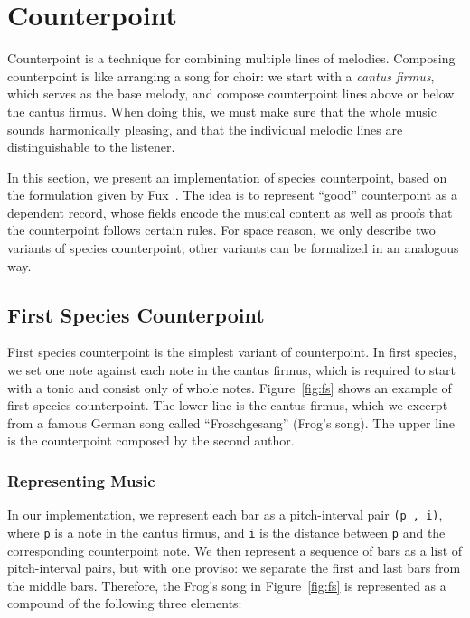 \section{Counterpoint}
\label{sec:cp}

Counterpoint is a technique for combining multiple lines of melodies.
Composing counterpoint is like arranging a song for choir:
we start with a \emph{cantus firmus}, which serves as the base melody,
and compose counterpoint lines above or below the cantus firmus.
When doing this, we must make sure that the whole music sounds
harmonically pleasing, and that the individual melodic lines are
distinguishable to the listener.

In this section, we present an implementation of species counterpoint,
based on the formulation given by Fux~\citep{fux-cp}.
The idea is to represent ``good'' counterpoint  as a dependent record,
whose fields encode the musical content as well as proofs that the
counterpoint follows certain rules.
For space reason, we only describe two variants of species counterpoint;
other variants can be formalized in an analogous way.

\subsection{First Species Counterpoint}
\label{sec:cp:fs}

\FS

First species counterpoint is the simplest variant of counterpoint.
In first species, we set one note against each note in the cantus firmus,
which is required to start with a tonic and consist only of whole notes.
Figure~\ref{fig:fs} shows an example of first species counterpoint.
The lower line is the cantus firmus, which we excerpt from a famous
German song called ``Froschgesang'' (Frog's song).
The upper line is the counterpoint composed by the second author.

\subsubsection{Representing Music}

In our implementation, we represent each bar as a pitch-interval
pair \texttt{(p ,  i)}, where \texttt{p} is a note in the cantus firmus,
and \texttt{i} is the distance between \texttt{p} and the corresponding
counterpoint note.
We then represent a sequence of bars as a list of pitch-interval pairs,
but with one proviso: we separate the first and last bars from the
middle bars.
Therefore, the Frog's song in Figure~\ref{fig:fs} is represented as a
compound of the following three elements:


